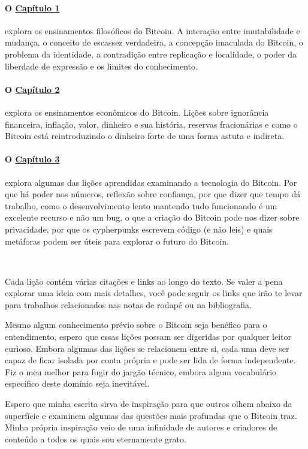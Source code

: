 \paragraph{O \hyperref[ch:philosophy]{Capítulo 1}}{explora os ensinamentos filosóficos do Bitcoin. A interação entre imutabilidade e mudança, o conceito de escassez verdadeira, a concepção imaculada do Bitcoin, o problema da identidade, a contradição entre replicação e localidade, o poder da liberdade de expressão e os limites do conhecimento. }

\paragraph{O \hyperref[ch:economics]{Capítulo 2}}{explora os ensinamentos econômicos do Bitcoin. Lições sobre ignorância financeira, inflação, valor, dinheiro e sua história, reservas fracionárias e como o Bitcoin está reintroduzindo o dinheiro forte de uma forma astuta e indireta.}

\paragraph{O \hyperref[ch:technology]{Capítulo 3}}{explora algumas das lições aprendidas examinando a tecnologia do Bitcoin. Por que há poder nos números, reflexão sobre confiança, por que dizer que tempo dá trabalho, como o desenvolvimento lento mantendo tudo funcionando é um excelente recurso e não um bug, o que a criação do Bitcoin pode nos dizer sobre privacidade, por que os cypherpunks escrevem código (e não leis) e quais metáforas podem ser úteis para explorar o futuro do Bitcoin.}

~

Cada lição contém várias citações e links ao longo do texto. Se valer a pena explorar uma ideia com mais detalhes, você pode seguir os links que irão te levar para trabalhos relacionados nas notas de rodapé ou na bibliografia.

Mesmo algum conhecimento prévio sobre o Bitcoin seja benéfico para o entendimento, espero que essas lições possam ser digeridas por qualquer leitor curioso. Embora algumas das lições se relacionem entre si, cada uma deve ser capaz de ficar isolada por conta própria e pode ser lida de forma independente. Fiz o meu melhor para fugir do jargão técnico, embora algum vocabulário específico deste domínio seja inevitável.

Espero que minha escrita sirva de inspiração para que outros olhem abaixo da superfície e examinem algumas das questões mais profundas que o Bitcoin traz. Minha própria inspiração veio de uma infinidade de autores e criadores de conteúdo a todos os quais sou eternamente grato.

